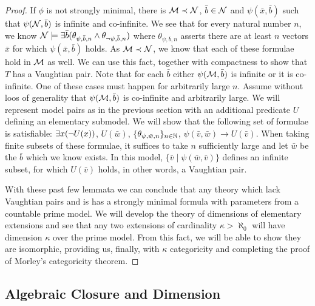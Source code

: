 \begin{proof}
If \(\phi\) is not strongly minimal, there is \(\mathcal{M} \prec \mathcal{N}\), \(\bar{b} \in \mathcal{N}\) and \(\psi(\bar{x}, \bar{b})\) such that \(\psi(\mathcal{N}, \bar{b})\) is infinite and co-infinite. 
We see that for every natural number \(n\), we know \(\mathcal{N} \models \exists \bar{b} (\theta_{\psi, \bar{b}, n} \land \theta_{\neg \psi, \bar{b}, n})\) where \(\theta_{\psi, \bar{b},n}\) asserts there are at least \(n\) vectors \(\bar{x}\) for which \(\psi(\bar{x}, \bar{b})\) holds. 
As \(\mathcal{M} \prec \mathcal{N}\), we know that each of these formulae hold in \(\mathcal{M}\) as well. 
We can use this fact, together with compactness to show that \(T\) has a Vaughtian pair.
Note that for each \(\bar{b}\) either \(\psi(\mathcal{M}, \bar{b})\) is infinite or it is co-infinite. 
One of these cases must happen for arbitrarily large \(n\).  %
Assume without loos of generality that \(\psi(\mathcal{M}, \bar{b})\) is co-infinite and arbitrarily large. 
We will represent model pairs as in the previous section with an additional predicate \(U\) defining an elementary submodel. 
We will show that the following set of formulae is satisfiable: 
\(\exists x (\neg U(x))\), \(U(\bar{w})\), \(\{\theta_{\psi, \bar{w}, n}\}_{n\in \mathbb{N}}\), \(\psi(\bar{v}, \bar{w}) \to U(\bar{v})\). 
When taking finite subsets of these formulae, it suffices to take \(n\) sufficiently large and let \(\bar{w}\) be the \(\bar{b}\) which we know exists.
In this model, \(\{\bar{v}\mid\psi(\bar{w}, \bar{v})\}\) defines an infinite subset, for which \(U(\bar{v})\) holds, in other words, a Vaughtian pair. %

With these past few lemmata we can conclude that any theory which lack Vaughtian pairs and is \omst has a strongly minimal formula with parameters from a countable prime model. 
We will develop the theory of dimensions of elementary extensions and see that any two extensions of cardinality \(\kappa > \aleph_0\) will have dimension \(\kappa\) over the prime model.
From this fact, we will be able to show they are isomorphic, providing us, finally, with \(\kappa\) categoricity and completing the proof of Morley's categoricity theorem. 
\end{proof}

\subsection{Algebraic Closure and Dimension}

